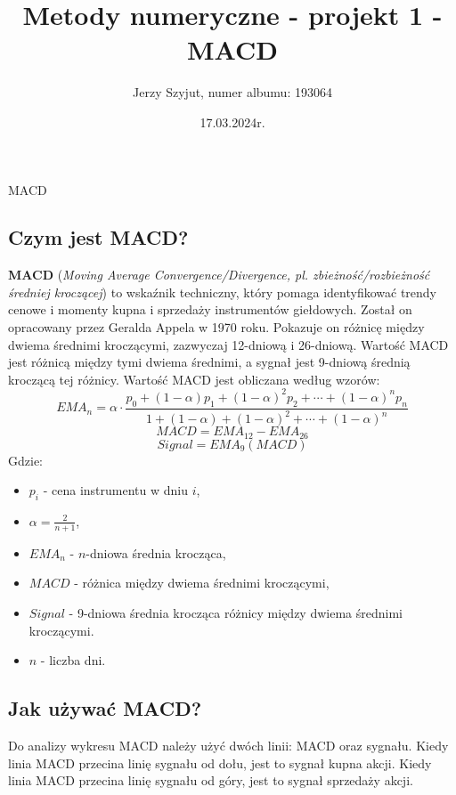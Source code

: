 \documentclass{article}
\title{Metody numeryczne - projekt 1 - MACD}
\author{Jerzy Szyjut, numer albumu: 193064}
\date{17.03.2024r.}
\begin{document}
\maketitle

\begin{section}{MACD}
    \subsection{Czym jest MACD?}
    \textbf{MACD} (\textit{Moving Average Convergence/Divergence, pl. zbieżność/rozbieżność średniej kroczącej}) to wskaźnik techniczny, 
    który pomaga identyfikować trendy cenowe i momenty kupna i sprzedaży instrumentów giełdowych. Został on opracowany przez Geralda Appela w 1970 roku.
    Pokazuje on różnicę między dwiema średnimi kroczącymi, zazwyczaj 12-dniową i 26-dniową. Wartość MACD jest różnicą między tymi dwiema średnimi, 
    a sygnał jest 9-dniową średnią kroczącą tej różnicy. Wartość MACD jest obliczana według wzorów:
    \begin{equation}
        EMA_{n} = \alpha \cdot \frac{p_{0} + (1-\alpha) p_{1} + (1-\alpha)^{2} p_{2} + \cdots + (1-\alpha)^{n} p_{n}}{1 + (1-\alpha) + (1-\alpha)^{2} + \cdots + (1-\alpha)^{n}}
    \end{equation}
    \begin{equation}
        MACD = EMA_{12} - EMA_{26}
    \end{equation}
    \begin{equation}
        Signal = EMA_{9}(MACD)
    \end{equation}
    Gdzie:
    \begin{itemize}
        \item $p_{i}$ - cena instrumentu w dniu $i$,
        \item $\alpha = \frac{2}{n+1}$,
        \item $EMA_{n}$ - $n$-dniowa średnia krocząca,
        \item $MACD$ - różnica między dwiema średnimi kroczącymi,
        \item $Signal$ - 9-dniowa średnia krocząca różnicy między dwiema średnimi kroczącymi.
        \item $n$ - liczba dni.
    \end{itemize}
    \subsection{Jak używać MACD?}
    Do analizy wykresu MACD należy użyć dwóch linii: MACD oraz sygnału. Kiedy linia MACD przecina linię sygnału od dołu, jest to sygnał kupna akcji.
    Kiedy linia MACD przecina linię sygnału od góry, jest to sygnał sprzedaży akcji.
\end{section}
\end{document}
